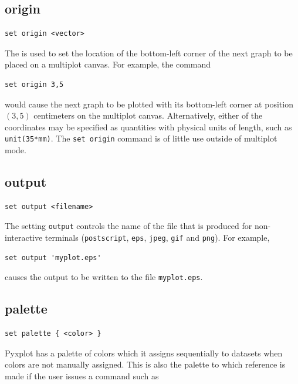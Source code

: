 \subsection{origin}

\begin{verbatim}
set origin <vector>
\end{verbatim}

The  is used to set the location of the bottom-left corner
of the next graph to be placed on a multiplot canvas.  For example, the
command

\begin{verbatim}
set origin 3,5
\end{verbatim}

\noindent would cause the next graph to be plotted with its bottom-left corner
at position $(3,5)$ centimeters on the multiplot canvas. Alternatively, either
of the coordinates may be specified as quantities with physical units of
length, such as {\tt unit(35*mm)}.  The {\tt set origin} command is of little
use outside of multiplot mode.


\subsection{output}

\begin{verbatim}
set output <filename>
\end{verbatim}

The setting {\tt output} controls the name of the file that is produced for
non-interactive terminals ({\tt postscript}, {\tt eps}, {\tt jpeg}, {\tt gif}
and {\tt png}).  For example,

\begin{verbatim}
set output 'myplot.eps'
\end{verbatim}

\noindent causes the output to be written to the file {\tt myplot.eps}.


\subsection{palette}

\begin{verbatim}
set palette { <color> }
\end{verbatim}

Pyxplot has a palette of colors which it assigns sequentially to datasets when
colors are not manually assigned. This is also the palette to which reference
is made if the user issues a command such as

